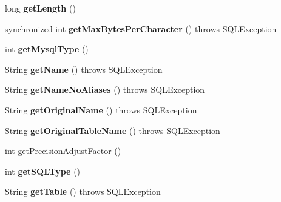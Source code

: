 \begin{DoxyCompactItemize}
\item 
\mbox{\label{classcom_1_1mysql_1_1jdbc_1_1_field_a034417996afe227564f299c7200531ad}} 
long {\bfseries get\+Length} ()
\item 
\mbox{\label{classcom_1_1mysql_1_1jdbc_1_1_field_a2704550e81bc8247dfb83141a4d0dad0}} 
synchronized int {\bfseries get\+Max\+Bytes\+Per\+Character} ()  throws S\+Q\+L\+Exception 
\item 
\mbox{\label{classcom_1_1mysql_1_1jdbc_1_1_field_a7ee67c7b1f0b6dc2db297e3b0a35e424}} 
int {\bfseries get\+Mysql\+Type} ()
\item 
\mbox{\label{classcom_1_1mysql_1_1jdbc_1_1_field_aed58a56da49b8f39d1dc6f647ffdd4f8}} 
String {\bfseries get\+Name} ()  throws S\+Q\+L\+Exception 
\item 
\mbox{\label{classcom_1_1mysql_1_1jdbc_1_1_field_abde2976b2f8fc2a4d11361543c249dfb}} 
String {\bfseries get\+Name\+No\+Aliases} ()  throws S\+Q\+L\+Exception 
\item 
\mbox{\label{classcom_1_1mysql_1_1jdbc_1_1_field_a621530c51e8c54a4a2b0e31083e4dd68}} 
String {\bfseries get\+Original\+Name} ()  throws S\+Q\+L\+Exception 
\item 
\mbox{\label{classcom_1_1mysql_1_1jdbc_1_1_field_a848825c89c60bb1e484fccb324bc29fd}} 
String {\bfseries get\+Original\+Table\+Name} ()  throws S\+Q\+L\+Exception 
\item 
int \mbox{\hyperlink{classcom_1_1mysql_1_1jdbc_1_1_field_a9b3064e50f673507d96842fd16496a0d}{get\+Precision\+Adjust\+Factor}} ()
\item 
\mbox{\label{classcom_1_1mysql_1_1jdbc_1_1_field_afe6421ac3301e4fc1b1e80a863b40a2c}} 
int {\bfseries get\+S\+Q\+L\+Type} ()
\item 
\mbox{\label{classcom_1_1mysql_1_1jdbc_1_1_field_a26f3b8ef3fdf16f36b186107b259f787}} 
String {\bfseries get\+Table} ()  throws S\+Q\+L\+Exception 

\end{DoxyCompactItemize}
